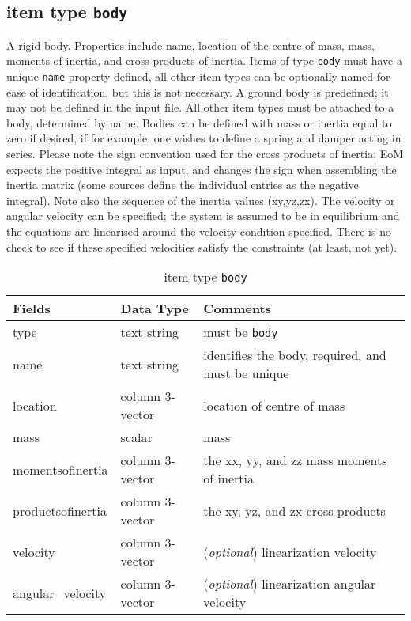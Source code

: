\subsection{item type \texttt{body}}
A rigid body. Properties include name, location of the centre of mass, mass, moments of inertia, and cross products of inertia.  Items of type \texttt{body} must have a unique \texttt{name} property defined, all other item types can be optionally named for ease of identification, but this is not necessary.  A ground body is predefined; it may not be defined in the input file.  All other item types must be attached to a body, determined by name.  Bodies can be defined with mass or inertia equal to zero if desired, if for example, one wishes to define a spring and damper acting in series.  Please note the sign convention used for the cross products of inertia; EoM expects the positive integral as input, and changes the sign when assembling the inertia matrix (some sources define the individual entries as the negative integral).  Note also the sequence of the inertia values (xy,yz,zx).  The velocity or angular velocity can be specified; the system is assumed to be in equilibrium and the equations are linearised around the velocity condition specified.  There is no check to see if these specified velocities satisfy the constraints (at least, not yet).

\begin{table}[!h]
\caption{item type \texttt{body}}
\label{body}
\begin{center}
\begin{tabular}{lll}
\toprule
Fields & Data Type & Comments\\
\midrule
type & text string & must be \texttt{body}\\
name & text string & identifies the body, required, and must be unique\\
location & column 3-vector & location of centre of mass\\
mass & scalar & mass\\
momentsofinertia & column 3-vector & the xx, yy, and zz mass moments of inertia\\
productsofinertia & column 3-vector & the xy, yz, and zx cross products\\
velocity & column 3-vector & (\emph{optional}) linearization velocity\\
angular\_velocity & column 3-vector & (\emph{optional}) linearization angular velocity\\
\bottomrule
\end{tabular}
\end{center}
\end{table}
\clearpage

